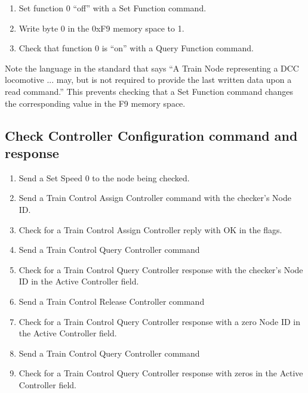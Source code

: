 \begin{enumerate}

    \item Set function 0 ``off'' with a Set Function command.

    \item Write byte 0 in the 0xF9 memory space to 1.

    \item Check that function 0 is ``on'' with a Query Function command.

\end{enumerate}

Note the language in the standard that says 
``A Train Node representing a DCC locomotive ... may, 
but is not required to provide the last written data upon a read command.''
This prevents checking that a Set Function command changes the corresponding
value in the F9 memory space.


\subsection{Check Controller Configuration command and response}

\begin{enumerate}

    \item Send a Set Speed 0 to the node being checked.
    
    \item Send a Train Control Assign Controller command with the checker's Node ID.
    \item Check for a Train Control Assign Controller reply with OK in the flags.

    \item Send a Train Control Query Controller command
    \item Check for a Train Control Query Controller response with the checker's Node ID
        in the Active Controller field.

    \item Send a Train Control Release Controller command
    \item Check for a Train Control Query Controller response with a zero Node ID
        in the Active Controller field.

    \item Send a Train Control Query Controller command
    \item Check for a Train Control Query Controller response with zeros
        in the Active Controller field.

\end{enumerate}

